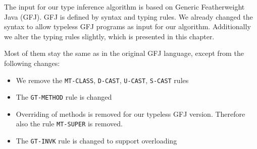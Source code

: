 The input for our type inference algorithm is based on Generic Featherweight Java (GFJ).
GFJ is defined by syntax and typing rules.
We already changed the syntax to allow typeless GFJ programs as input for our algorithm.
Additionally we alter the typing rules slightly, which is presented in this chapter.


Most of them stay the same as in the original GFJ language,
except from the following changes:
\begin{itemize}
\item We remove the \texttt{MT-CLASS}, \texttt{D-CAST}, \texttt{U-CAST}, \texttt{S-CAST} rules
\item The \texttt{GT-METHOD} rule is changed
\item Overriding of methods is removed for our typeless GFJ version. Therefore also the rule \texttt{MT-SUPER} is removed.
\item The \texttt{GT-INVK} rule is changed to support overloading
\end{itemize}


